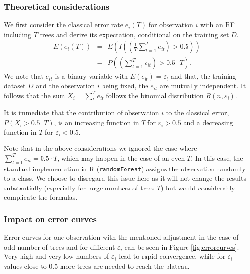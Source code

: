\documentclass[paper=a4
               ,12pt
               ,DIV=12
               ,parskip=half
               ,titlepage=on
               ,headinclude 
               ,footinclude
               ,headsepline
               ,footsepline         %
               ,ilines 
               ]{scrartcl}
\begin{document}
\subsubsection{Theoretical considerations}
We first consider the classical error rate $e_i(T)$ for observation $i$ with an RF including $T$ trees and derive its expectation, conditional on the training set $D$. 
\begin{eqnarray*}
 E(e_i(T)) & = &  E \left(I \left( \left(\frac{1}{T} \sum_{t=1}^T e_{it} \right) > 0.5 \right) \right)\\
 & = & P \left( \left(\sum_{t=1}^T e_{it} \right) > 0.5 \cdot T \right). 
\end{eqnarray*}
We note that $e_{it}$ is a binary variable with $E(e_{it})=\varepsilon_i$ and that, the training dataset $D$ and the observation $i$ being fixed, the $e_{it}$ are mutually independent. It follows that  the sum $X_i=\sum_{t}^Te_{it}$ follows the binomial distribution $B(n, \varepsilon_i)$. 

It is immediate that the contribution of observation $i$ to the classical error, $P(X_i>0.5 \cdot T)$, is an increasing function in $T$ for $\varepsilon_i > 0.5$ and a decreasing function in $T$ for $\varepsilon_i < 0.5$. 

Note that in the above considerations we ignored the case where $\sum_{t=1}^T e_{it}  = 0.5 \cdot T$, which may happen in the case of an even $T$. In this case, the standard implementation in R (\texttt{randomForest}) assigns the observation randomly to a class. We choose to disregard this issue here as it will not change the results substantially (especially for large numbers of trees $T$) but would considerably complicate the formulas.  

\subsubsection{Impact on error curves}
Error curves for one observation with the mentioned adjustment in the case of odd number of trees and for different $\varepsilon_i$ can be seen in Figure \ref{fig:errorcurves}. Very high and very low numbers of $\varepsilon_i$ lead to rapid convergence, while for $\varepsilon_i$-values close to 0.5 more trees 
are needed to reach the plateau. 
\end{document}
